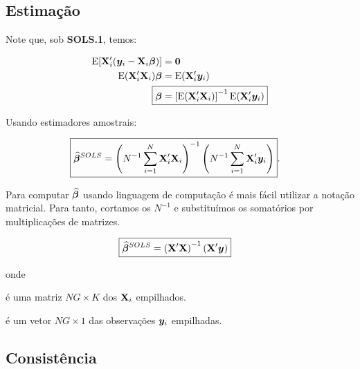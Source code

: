 \documentclass[11pt, oneside, a4paper, article]{article}
\numberwithin{equation}{section}
\begin{document}
\subsection{Estimação}
Note que, sob \textbf{SOLS.1}, temos:

\vspace{-1 em}
\begin{align} 
\notag
\E[ \Xmat_{i}' ( \yvec_{i} - \Xmat_{i} \betavec ) ] &= \zerovec
\\
\notag
\E( \Xmat_{i}' \Xmat_{i} ) \betavec &= \E( \Xmat_{i}' \yvec_{i} )  
\\
\label{sols:beta}
\Aboxed{
\betavec &=
\left[ \E( \Xmat_{i}' \Xmat_{i} )  \right]^{-1}
\E( \Xmat_{i}' \yvec_{i} )  }
\end{align}

Usando estimadores amostrais:

\vspace{-1 em}
\begin{align} \label{sols:betahat}
\Aboxed{
\betahatbold^{SOLS} &=
\left( N^{-1} \sum_{i=1}^{N} \Xmat_{i}' \Xmat_{i}   \right)^{-1}
\left( N^{-1} \sum_{i=1}^{N} \Xmat_{i}' \yvec_{i}   \right)
}.
\end{align}

Para computar $\widehat{\boldsymbol{\beta}}$ usando linguagem de computação é mais fácil utilizar a notação matricial.
Para tanto, cortamos os $N^{-1}$ e substituímos os somatórios por multiplicações de matrizes.

\vspace{-1 em}
\begin{align} 
\label{sols:betahat:mat}
\Aboxed{
\betahatbold^{SOLS} &=
\left(  \Xmat' \Xmat   \right)^{-1} \left(  \Xmat' \yvec   \right)
}
\end{align}

\noindent
onde
\begin{description}[noitemsep]
\item [$\Xmat \equiv (\Xmat_{1}', \dots, \Xmat_{N}')$]  é uma matriz $NG \times K$ dos $\mathbf{X}_{i}$ empilhados.

\item [$\yvec \equiv (\yvec_{1}', \dots, \yvec_{N}')$] é um vetor $NG \times 1$ das observações $\boldsymbol{y}_{i}$ empilhadas.
\end{description}

\subsection{Consistência}
\end{document}
